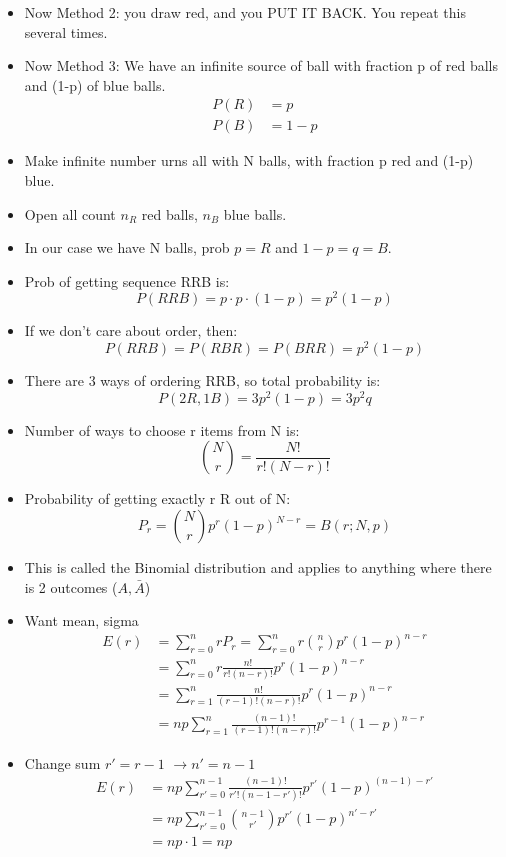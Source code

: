 \begin{itemize}
    \item Now Method 2: you draw red, and you PUT IT BACK. You repeat this several times.
    \item Now Method 3: We have an infinite source of ball with fraction p of red balls and (1-p) of blue balls.
    \begin{align*}
        P(R) &= p \\
        P(B) &= 1-p
    \end{align*}
    \item Make infinite number urns all with N balls, with fraction p red and (1-p) blue.
    \item Open all count $n_R$ red balls, $n_B$ blue balls.
    \item In our case we have N balls, prob $p=R$ and $1-p=q=B$.
    \item Prob of getting sequence RRB is:
    \[ P(RRB) = p \cdot p \cdot (1-p) = p^2 (1-p) \]
    \item If we don't care about order, then:
    \[ P(RRB) = P(RBR) = P(BRR) = p^2 (1-p) \]
    \item There are 3 ways of ordering RRB, so total probability is:
    \[ P(2R,1B) = 3 p^2 (1-p) = 3 p^2 q \]
    \item Number of ways to choose r items from N is:
    \[ \binom{N}{r} = \frac{N!}{r!(N-r)!} \]
    \item Probability of getting exactly r R out of N:
    \[ P_r = \binom{N}{r} p^r (1-p)^{N-r} = B(r;N,p)\]
    \item This is called the Binomial distribution and applies to anything where there is 2 outcomes ($A, \bar{A}$)
    \item Want mean, sigma
    \begin{align*}
        E(r) &= \sum_{r=0}^n r P_r = \sum_{r=0}^n r \binom{n}{r} p^r (1-p)^{n-r} \\
        &= \sum_{r=0}^n r \frac{n!}{r!(n-r)!} p^r (1-p)^{n-r} \\
        &= \sum_{r=1}^n \frac{n!}{(r-1)!(n-r)!} p^r (1-p)^{n-r} \\
        &= np \sum_{r=1}^n \frac{(n-1)!}{(r-1)!(n-r)!} p^{r-1} (1-p)^{n-r}
    \end{align*}
    \item Change sum $r' = r-1$ $\rightarrow n'=n-1$
    \begin{align*}
        E(r) &= np \sum_{r'=0}^{n-1} \frac{(n-1)!}{r'!(n-1-r')!} p^{r'} (1-p)^{(n-1)-r'} \\
        &= np \sum_{r'=0}^{n-1} \binom{n-1}{r'} p^{r'} (1-p)^{n'-r'} \\
        &= np \cdot 1 = np
    \end{align*}


\end{itemize}
